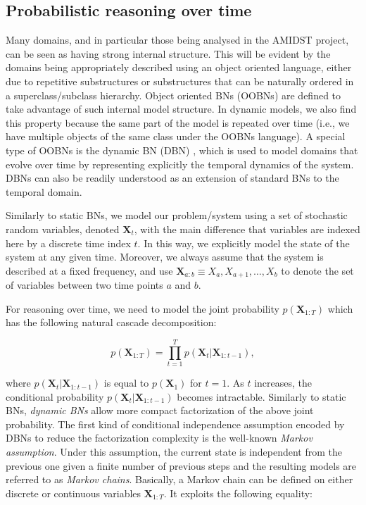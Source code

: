 \subsection{Probabilistic reasoning over time}\label{SubSection:DBNs}

Many domains, and in particular those being analysed in the AMIDST project, can be seen as having strong internal structure. This will be evident by the domains being appropriately described using an object oriented language, either due to repetitive substructures or substructures that can be naturally ordered in a superclass/subclass hierarchy.  Object oriented BNs \cite{KollerPfeffer1997} (OOBNs) are defined to take advantage of such internal model structure. In dynamic models, we also find this property because the same part of the model is repeated over time (i.e., we have multiple objects of the same class under the OOBNs language). A special type of OOBNs is the dynamic BN (DBN) \cite{DeanKanazawa1989}, which is used to model domains that evolve over time by representing explicitly the temporal dynamics of the system. DBNs can also be readily understood as an extension of standard BNs to the temporal domain. 

Similarly to static BNs, we model our problem/system using a set of stochastic random variables, denoted $\bm X_t$, with the main difference that variables are indexed here by a discrete time index $t$. In this way, we explicitly model the state of the system at any given time. Moreover, we always assume that the system is described at a fixed frequency, and use $\bm X_{a:b} \equiv X_a,X_{a+1},\ldots,X_{b}$ to denote the set of variables between two time points $a$ and $b$.  

For reasoning over time, we need to model the joint probability $p(\bm X_{1:T})$ which has the following natural cascade decomposition:

$$p(\bm X_{1:T})  = \prod_{t=1}^T p(\bm X_t|\bm X_{1:t-1}),$$

\noindent where $p(\bm X_t|\bm X_{1:t-1})$ is equal to $p(\bm X_1)$ for $t=1$. As $t$ increases, the conditional probability $p(\bm X_t|\bm X_{1:t-1})$ becomes intractable. Similarly to static BNs, \textit{dynamic BNs} allow more compact factorization of the above joint probability. The first kind of conditional independence assumption encoded by DBNs to reduce the factorization complexity is the well-known \textit{Markov assumption}. Under this assumption, the current state is independent from the previous one given a finite number of previous steps and the resulting models are referred to as \textit{Markov chains}. Basically, a Markov chain can be defined on either discrete or continuous variables $\bm X_{1:T}$. It exploits the following equality:

